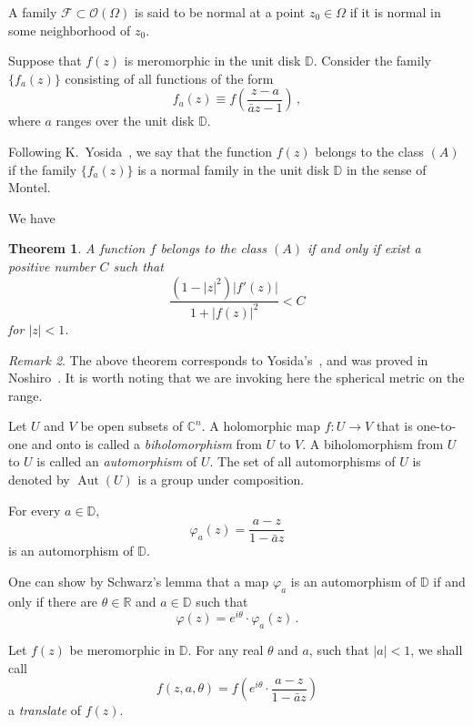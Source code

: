 \documentclass[pdflatex]{sn-jnl}%
\newtheorem{thm}{Theorem}[section]
\theoremstyle{definition}
\theoremstyle{remark}
\newtheorem{rem}[thm]{Remark}
\numberwithin{equation}{section}
\newcommand{\Cn}{\mathbb{C}^n}
\newcommand{\D}{\mathbb{D}}
\begin{document}
    A family $\mathcal{F}\subset \mathcal{O}(\Omega)$ is said to be normal at a point $z_0 \in \Omega$ if it is normal in some neighborhood of $z_0$.

    Suppose that $f(z)$ is meromorphic in the unit disk $\D$.
    Consider the family $\{f_a(z)\}$ consisting of all functions of the form
    \[
        f_a(z) \equiv f\!\left(\frac{z - a}{\bar{a}z - 1}\right)\,,
    \]
    where $a$ ranges over the unit disk $\D$.

    Following K.~Yosida~\cite{zbMATH03013560}, we say that the function $f(z)$ belongs to the class $(A)$ if the family $\{f_a(z)\}$ is a normal family in the unit disk $\D$ in the sense of Montel.

    We have

    \begin{thm}
        \label{thm:yosida-noshiro}
        A function $f$ belongs to the class $(A)$ if and only if exist a positive number $C$ such that
        \[
            \frac{\left(1-|z|^2\right)|f'(z)|}{1+|f(z)|^2}<C
        \]
        for $|z|<1$.
    \end{thm}

    \begin{rem}
        The above theorem corresponds to Yosida's~\cite[Theorem 1]{zbMATH03013560}, and was proved in Noshiro~\cite[Theorem 1]{zbMATH03034393}.
        It is worth noting that we are invoking here the spherical metric on the range.
    \end{rem}

    Let $U$ and $V$ be open subsets of $\Cn$.
    A holomorphic map $f: U \rightarrow V$ that is one-to-one and onto is called a \emph{biholomorphism} from $U$ to $V$.
    A biholomorphism from $U$ to $U$ is called an \emph{automorphism} of $U$.
    The set of all automorphisms of $U$ is denoted by $\operatorname{Aut}(U)$ is a group under composition.

    For every $a \in \mathbb{D}$,
    \[
        \varphi_a(z)=\frac{a-z}{1-\bar{a} z}
    \]
    is an automorphism of $\mathbb{D}$.

    One can show by Schwarz's lemma that a map $\varphi_a$ is an automorphism of $\mathbb{D}$ if and only if there are $\theta \in \mathbb{R}$ and $a \in \mathbb{D}$ such that
    \[
        \varphi(z)=e^{i \theta}\cdot \varphi_a(z)\,.
    \]

    Let $f(z)$ be meromorphic in $\D$.
    For any real $\theta$ and $a$, such that $|a|<1$, we shall call
    \[
        f(z, a, \theta)=f\left(e^{i \theta}\cdot \frac{a-z}{1-\bar{a} z}\right)
    \]
    a \emph{translate} of $f(z)$.
\end{document}
